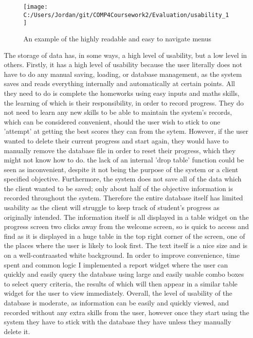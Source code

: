\begin{figure}[H]
	\texttt{[image: C:/Users/Jordan/git/COMP4Coursework2/Evaluation/usability\_1]}
	\caption{An example of the highly readable and easy to navigate menus}
\end{figure}

The storage of data has, in some ways, a high level of usability, but a low level in others. Firstly, it has a high level of usability because the user literally does not have to do any manual saving, loading, or database management, as the system saves and reads everything internally and automatically at certain points. All they need to do is complete the homeworks using easy inputs and maths skills, the learning of which is their responsibility, in order to record progress. They do not need to learn any new skills to be able to maintain the system's records, which can be considered convenient, should the user wish to stick to one 'attempt' at getting the best scores they can from the sytem. However, if the user wanted to delete their current progress and start again, they would have to manually remove the database file in order to reset their progress, which they might not know how to do. the lack of an internal 'drop table' function could be seen as inconvenient, despite it not being the purpose of the system or a client specified objective. Furthermore, the system does not save all of the data which the client wanted to be saved; only about half of the objective information is recorded throughout the system. Therefore the entire database itself has limited usability as the client will struggle to keep track of student's progress as originally intended. The information itself is all displayed in a table widget on the progress screen two clicks away from the welcome screen, so is quick to access and find as it is displayed in a huge table in the top right corner of the screen, one of the places where the user is likely to look first. The text itself is a nice size and is on a well-contraasted white background. In order to improve convenience, time spent and common logic I implemented a report widget where the user can quickly and easily query the database using large and easily usable combo boxes to select query criteria, the results of which will then appear in a similar table widget for the user to view immediately. Overall, the level of usability of the database is moderate, as information can be easily and quickly viewed, and recorded without any extra skills from the user, however once they start using the system they have to stick with the database they have unless they manually delete it.

